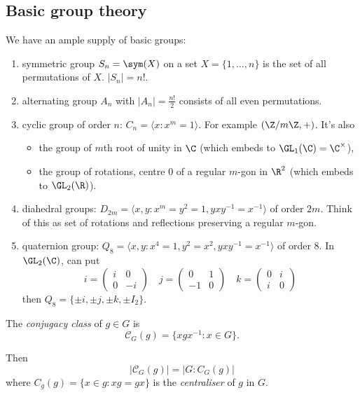 \documentclass[a4paper]{article}
\newcommand{\ccl}{{\mathcal C}} %
\theoremstyle{definition}
\begin{document}
\subsection{Basic group theory}

We have an ample supply of basic groups:
\begin{enumerate}
\item symmetric group \(S_n = \sym(X)\) on a set \(X = \{1, \dots, n\}\) is the set of all permutations of \(X\). \(|S_n| = n!\).
\item alternating group \(A_n\) with \(|A_n| = \frac{n!}{2}\) consists of all even permutations.
\item cyclic group of order \(n\): \(C_n = \langle x: x^m = 1\rangle\). For example \((\Z/m\Z, +)\). It's also
  \begin{itemize}
  \item the group of \(m\)th root of unity in \(\C\) (which embeds to \(\GL_1(\C) = \C^\times\)),
  \item the group of rotations, centre \(0\) of a regular \(m\)-gon in \(\R^2\) (which embeds to \(\GL_2(\R)\)).
  \end{itemize}
\item diahedral groups: \(D_{2m} = \langle x, y: x^m = y^2 = 1, yxy^{-1} = x^{-1} \rangle\) of order \(2m\). Think of this as set of rotations and reflections preserving a regular \(m\)-gon.
\item quaternion group: \(Q_8 = \langle x, y: x^4 = 1, y^2 = x^2, yxy^{-1} = x^{-1} \rangle\) of order \(8\). In \(\GL_2(\C)\), can put
  \[
    i =
    \begin{pmatrix}
      i & 0 \\
      0 & -i
    \end{pmatrix}
    \quad
    j =
    \begin{pmatrix}
      0 & 1 \\
      -1 & 0
    \end{pmatrix}
    \quad
     k =
    \begin{pmatrix}
      0 & i \\
      i & 0
    \end{pmatrix}
  \]
  then \(Q_8 = \{\pm i, \pm j, \pm k, \pm I_2\}\).
\end{enumerate}

\begin{definition}
  The \emph{conjugacy class} of \(g \in G\) is
  \[
    \ccl_G(g) = \{xgx^{-1}: x \in G\}.
  \]

  Then
  \[
    |\ccl_G(g)| = |G: C_G(g)|
  \]
  where \(C_g(g) = \{x \in g: xg = gx\}\) is the \emph{centraliser} of \(g\) in \(G\).
\end{definition}
\end{document}

